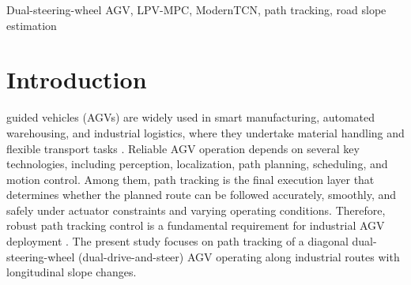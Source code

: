 \documentclass{ieeeaccess}
\newcommand{\citep}[1]{\cite{#1}}
\begin{document}
\begin{keywords}

Dual-steering-wheel AGV, LPV-MPC, ModernTCN, path tracking, road slope estimation

\end{keywords}

\titlepgskip=-21pt
\maketitle

\section{Introduction}

 guided vehicles (AGVs) are widely used in smart manufacturing, automated warehousing, and industrial logistics, where they undertake material handling and flexible transport tasks \citep{Zhang2023AGVSurvey,Oyekanlu2020AGVReview,Bhargava2024AGVReview}. Reliable AGV operation depends on several key technologies, including perception, localization, path planning, scheduling, and motion control. Among them, path tracking is the final execution layer that determines whether the planned route can be followed accurately, smoothly, and safely under actuator constraints and varying operating conditions. Therefore, robust path tracking control is a fundamental requirement for industrial AGV deployment \citep{DeRyck2020AGVControlReview}. The present study focuses on path tracking of a diagonal dual-steering-wheel (dual-drive-and-steer) AGV operating along industrial routes with longitudinal slope changes.
\end{document}
